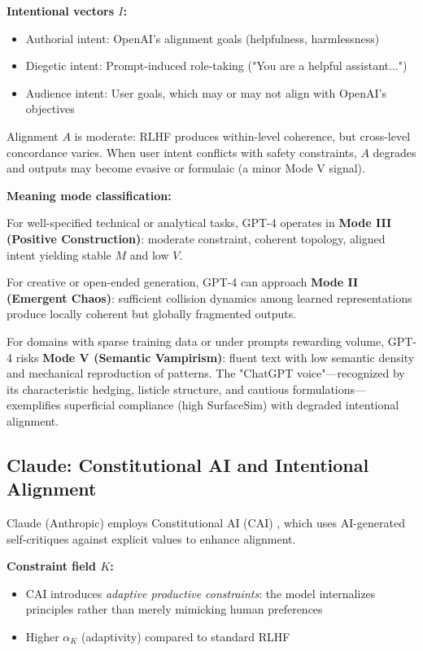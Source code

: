 \documentclass[12pt]{article}
\begin{document}
\textbf{Intentional vectors $I$:}
\begin{itemize}
\item Authorial intent: OpenAI's alignment goals (helpfulness, harmlessness)
\item Diegetic intent: Prompt-induced role-taking ("You are a helpful assistant...")
\item Audience intent: User goals, which may or may not align with OpenAI's objectives
\end{itemize}

Alignment $A$ is moderate: RLHF produces within-level coherence, but cross-level concordance varies. When user intent conflicts with safety constraints, $A$ degrades and outputs may become evasive or formulaic (a minor Mode V signal).

\textbf{Meaning mode classification:}

For well-specified technical or analytical tasks, GPT-4 operates in \textbf{Mode III (Positive Construction)}: moderate constraint, coherent topology, aligned intent yielding stable $M$ and low $V$.

For creative or open-ended generation, GPT-4 can approach \textbf{Mode II (Emergent Chaos)}: sufficient collision dynamics among learned representations produce locally coherent but globally fragmented outputs.

For domains with sparse training data or under prompts rewarding volume, GPT-4 risks \textbf{Mode V (Semantic Vampirism)}: fluent text with low semantic density and mechanical reproduction of patterns. The "ChatGPT voice"—recognized by its characteristic hedging, listicle structure, and cautious formulations—exemplifies superficial compliance (high SurfaceSim) with degraded intentional alignment.

\subsection{Claude: Constitutional AI and Intentional Alignment}

Claude (Anthropic) employs Constitutional AI (CAI) \citep{bai2022constitutional}, which uses AI-generated self-critiques against explicit values to enhance alignment.

\textbf{Constraint field $K$:}
\begin{itemize}
\item CAI introduces \textit{adaptive productive constraints}: the model internalizes principles rather than merely mimicking human preferences
\item Higher $\alpha_K$ (adaptivity) compared to standard RLHF
\end{itemize}
\end{document}
